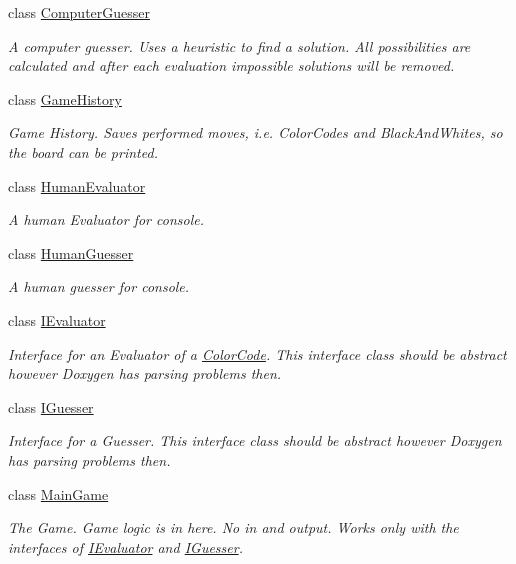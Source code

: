 \begin{DoxyCompactItemize}
class \hyperlink{classmastermind_1_1logic_1_1_computer_guesser}{Computer\+Guesser}
\begin{DoxyCompactList}\small\item\em A computer guesser. Uses a heuristic to find a solution. All possibilities are calculated and after each evaluation impossible solutions will be removed. \end{DoxyCompactList}\item 
class \hyperlink{classmastermind_1_1logic_1_1_game_history}{Game\+History}
\begin{DoxyCompactList}\small\item\em Game History. Saves performed moves, i.\+e. Color\+Codes and Black\+And\+Whites, so the board can be printed. \end{DoxyCompactList}\item 
class \hyperlink{classmastermind_1_1logic_1_1_human_evaluator}{Human\+Evaluator}
\begin{DoxyCompactList}\small\item\em A human Evaluator for console. \end{DoxyCompactList}\item 
class \hyperlink{classmastermind_1_1logic_1_1_human_guesser}{Human\+Guesser}
\begin{DoxyCompactList}\small\item\em A human guesser for console. \end{DoxyCompactList}\item 
class \hyperlink{classmastermind_1_1logic_1_1_i_evaluator}{I\+Evaluator}
\begin{DoxyCompactList}\small\item\em Interface for an Evaluator of a \hyperlink{classmastermind_1_1logic_1_1_color_code}{Color\+Code}. This interface class should be abstract however Doxygen has parsing problems then. \end{DoxyCompactList}\item 
class \hyperlink{classmastermind_1_1logic_1_1_i_guesser}{I\+Guesser}
\begin{DoxyCompactList}\small\item\em Interface for a Guesser. This interface class should be abstract however Doxygen has parsing problems then. \end{DoxyCompactList}\item 
class \hyperlink{classmastermind_1_1logic_1_1_main_game}{Main\+Game}
\begin{DoxyCompactList}\small\item\em The Game. Game logic is in here. No in and output. Works only with the interfaces of \hyperlink{classmastermind_1_1logic_1_1_i_evaluator}{I\+Evaluator} and \hyperlink{classmastermind_1_1logic_1_1_i_guesser}{I\+Guesser}. \end{DoxyCompactList}\item 

\end{DoxyCompactItemize}
